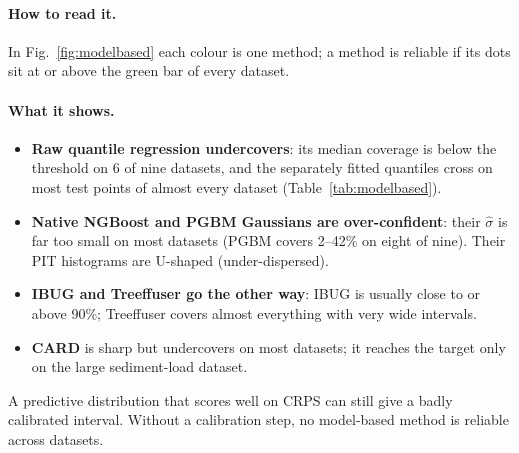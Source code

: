 \documentclass[11pt]{article}
\begin{document}
\paragraph{How to read it.} In Fig.~\ref{fig:modelbased} each colour is one method; a method is reliable if its dots sit at or above the green bar
of every dataset. \paragraph{What it shows.}
\begin{itemize}
\item \textbf{Raw quantile regression undercovers}: its median coverage is below the threshold on 6 of nine datasets, and the separately fitted quantiles cross on most test points of almost every dataset (Table~\ref{tab:modelbased}).
\item \textbf{Native NGBoost and PGBM Gaussians are over-confident}: their $\hat\sigma$ is far too small on most datasets (PGBM covers 2--42\% on eight of nine). Their PIT histograms are U-shaped (under-dispersed).
\item \textbf{IBUG and Treeffuser go the other way}: IBUG is usually close to or above 90\%; Treeffuser covers almost everything with very wide intervals.
\item \textbf{CARD} is sharp but undercovers on most datasets; it reaches the target only on the large sediment-load dataset.
\end{itemize}
\begin{insight}[Takeaway Q1]
A predictive distribution that scores well on CRPS can still give a badly calibrated interval. Without a calibration step, no model-based method is reliable across datasets.
\end{insight}
\end{document}
